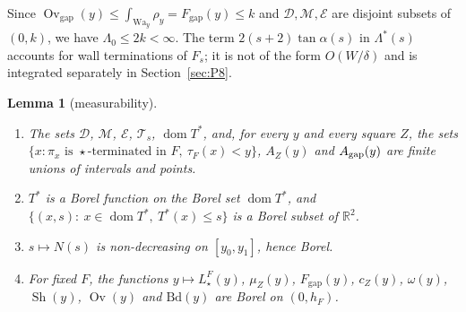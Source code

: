 \documentclass[11pt]{amsart}
\newcommand{\R}{\mathbb R}
\newcommand{\cE}{\mathcal E}
\newcommand{\Sh}{\operatorname{Sh}}
\newcommand{\Ov}{\operatorname{Ov}}
\newcommand{\Ovgap}{\operatorname{Ov}_{\mathrm{gap}}}
\newcommand{\Fgap}{F_{\mathrm{gap}}}
\newcommand{\Lam}{\Lambda}
\newcommand{\Fs}{F_{s}}
\newcommand{\Tstar}{T^{*}}
\newtheorem{lemma}[theorem]{Lemma}
\theoremstyle{definition}
\theoremstyle{remark}
\numberwithin{equation}{section}
\begin{document}
Since $\Ovgap(y)\le\int_{\mathrm{Wa}_y}\rho_y=\Fgap(y)\le k$ and $\mathcal D,\mathcal M,\cE$ are disjoint subsets of
$(0,k)$, we have $\Lam_0\le2k<\infty$. The term $2(s+2)\tan\alpha(s)$ in $\Lam^*(s)$ accounts for wall terminations of
$\Fs$; it is not of the form $O(W/\delta)$ and is integrated separately in Section~\ref{sec:P8}.

\begin{lemma}[measurability]\label{lem:flows-meas}
\begin{enumerate}[label=(\alph*)]
\item The sets $\mathcal D$, $\mathcal M$, $\cE$, $\mathcal T_s$, $\operatorname{dom}\Tstar$, and, for every $y$ and every
square $Z$, the sets $\{x:\pi_x\text{ is }\star\text{-terminated in }F,\ \tau_F(x)<y\}$, $A_Z(y)$ and $A_{\rm gap}(y)$
are finite unions of intervals and points.
\item $\Tstar$ is a Borel function on the Borel set $\operatorname{dom}\Tstar$, and
$\{(x,s):\ x\in\operatorname{dom}\Tstar,\ \Tstar(x)\le s\}$ is a Borel subset of $\R^2$.
\item $s\mapsto N(s)$ is non-decreasing on $[y_0,y_1]$, hence Borel.
\item For fixed $F$, the functions $y\mapsto L^F_\star(y)$, $\mu_Z(y)$, $\Fgap(y)$, $c_Z(y)$, $\omega(y)$, $\Sh(y)$, $\Ov(y)$
and $\mathrm{Bd}(y)$ are Borel on $(0,h_F)$.
\end{enumerate}
\end{lemma}
\end{document}
